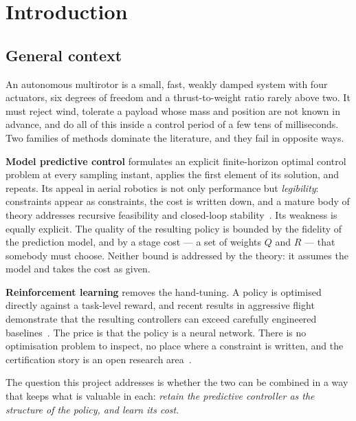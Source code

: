 \documentclass[11pt,a4paper,twoside,openright]{report}
\theoremstyle{plain}
\theoremstyle{definition}
\theoremstyle{remark}
\begin{document}
	\cleardoublepage
	\setcounter{page}{1}
	\chapter{Introduction}
	\label{ch:intro}

	\section{General context}

	An autonomous multirotor is a small, fast, weakly damped system with four
	actuators, six degrees of freedom and a thrust-to-weight ratio rarely above two.
	It must reject wind, tolerate a payload whose mass and position are not known in
	advance, and do all of this inside a control period of a few tens of
	milliseconds. Two families of methods dominate the literature, and they fail in
	opposite ways.

	\textbf{Model predictive control} formulates an explicit finite-horizon optimal
	control problem at every sampling instant, applies the first element of its
	solution, and repeats. Its appeal in aerial robotics is not only performance but
	\emph{legibility}: constraints appear as constraints, the cost is written down,
	and a mature body of theory addresses recursive feasibility and closed-loop
	stability~\cite{rawlings2017mpc,mayne2000constrained}. Its weakness is equally
	explicit. The quality of the resulting policy is bounded by the fidelity of the
	prediction model, and by a stage cost --- a set of weights $Q$ and $R$ --- that
	somebody must choose. Neither bound is addressed by the theory: it assumes the
	model and takes the cost as given.

	\textbf{Reinforcement learning} removes the hand-tuning. A policy is optimised
	directly against a task-level reward, and recent results in aggressive flight
	demonstrate that the resulting controllers can exceed carefully engineered
	baselines~\cite{hwangbo2017quadrl,kaufmann2023champion}. The price is that the
	policy is a neural network. There is no optimisation problem to inspect, no
	place where a constraint is written, and the certification story is an open
	research area~\cite{garcia2015safe}.

	The question this project addresses is whether the two can be combined in a way
	that keeps what is valuable in each: \emph{retain the predictive controller as
		the structure of the policy, and learn its cost}.
\end{document}
